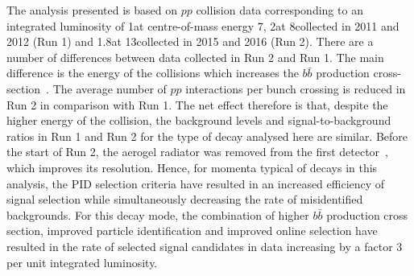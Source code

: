 The analysis presented is based on $pp$ collision data corresponding to an integrated luminosity of 1\invfb at centre-of-mass energy 7\tev, 2\invfb at 8\tev collected in 2011 and 2012 (Run 1) and 1.8\invfb at 13\tev collected in 2015 and 2016 (Run 2). There are a number of differences between data collected in Run 2 and Run 1. The main difference is the energy of the collisions which increases the $b\bar{b}$ production cross-section~\cite{LHCb-PAPER-2015-037}. The average number of $pp$ interactions per bunch crossing is reduced in Run 2 in comparison with Run 1. The net effect therefore is that, despite the higher energy of the collision, the background levels and signal-to-background ratios in Run 1 and Run 2 for the type of decay analysed here are similar. Before the start of Run 2, the aerogel radiator was removed from the first \rich detector~\cite{LHCb-DP-2012-003}, which improves its resolution. Hence, for momenta typical of decays in this analysis, the PID selection criteria have resulted in an increased efficiency of signal selection while simultaneously decreasing the rate of misidentified backgrounds. For this decay mode, the combination of higher $b\bar{b}$ production cross section, improved particle identification and improved online selection have resulted in the rate of selected signal candidates in data increasing by a factor 3 per unit integrated luminosity.
